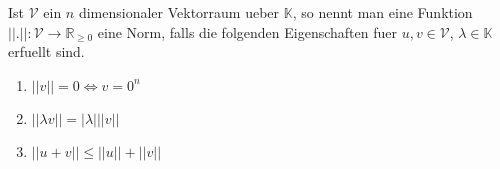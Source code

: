 Ist $\mathcal{V}$ ein $n$ dimensionaler Vektorraum ueber $\mathbb{K}$, so nennt man eine Funktion $|| . || : \mathcal{V} \to \mathbb{R}_{\geq 0}$ eine Norm, falls die folgenden Eigenschaften fuer $u,v \in \mathcal{V}$, $\lambda \in \mathbb{K}$ erfuellt sind.
\begin{enumerate}
  \item $|| v || = 0 \iff v = 0^n$
  \item $|| \lambda v || = |\lambda| || v ||$
  \item $|| u + v || \leq || u || + || v ||$
\end{enumerate}
